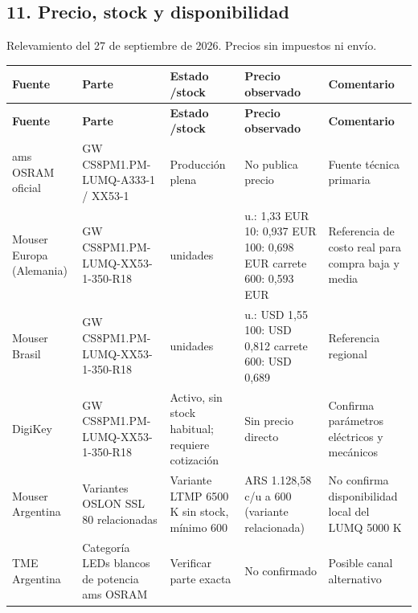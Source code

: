 \documentclass[11pt,a4paper]{article}
\begin{document}
\subsection*{11. Precio, stock y disponibilidad}

Relevamiento del 27 de septiembre de 2026. Precios sin impuestos ni envío.

\begingroup\footnotesize
\setlength{\tabcolsep}{3pt}
\setlength{\emergencystretch}{4em}
 
\begin{longtable}{@{}>{\RaggedRight\arraybackslash}p{}>{\RaggedRight\arraybackslash}p{}>{\RaggedRight\arraybackslash}p{}>{\RaggedRight\arraybackslash}p{}>{\RaggedRight\arraybackslash}p{}@{}}
\toprule
\scriptsize\textbf{Fuente} & \scriptsize\textbf{Parte} & \scriptsize\textbf{Estado \slash  stock} & \scriptsize\textbf{Precio observado} & \scriptsize\textbf{Comentario} \\
\midrule
\endfirsthead
\toprule
\scriptsize\textbf{Fuente} & \scriptsize\textbf{Parte} & \scriptsize\textbf{Estado \slash  stock} & \scriptsize\textbf{Precio observado} & \scriptsize\textbf{Comentario} \\
\midrule
\endhead
\bottomrule
\endfoot
ams OSRAM oficial & GW CS8PM1.PM-LUMQ-A333-1 / XX53-1 & Producción plena & No publica precio & Fuente técnica primaria \\
Mouser Europa (Alemania) & GW CS8PM1.PM-LUMQ-XX53-1-350-R18 & 1.669 unidades & 1 u.: 1,33 EUR \textperiodcentered{} 10: 0,937 EUR \textperiodcentered{} 100: 0,698 EUR \textperiodcentered{} carrete 600: 0,593 EUR & Referencia de costo real para compra baja y media \\
Mouser Brasil & GW CS8PM1.PM-LUMQ-XX53-1-350-R18 & 1.669 unidades & 1 u.: USD 1,55 \textperiodcentered{} 100: USD 0,812 \textperiodcentered{} carrete 600: USD 0,689 & Referencia regional \\
DigiKey & GW CS8PM1.PM-LUMQ-XX53-1-350-R18 & Activo, sin stock habitual; requiere cotización & Sin precio directo & Confirma parámetros eléctricos y mecánicos \\
Mouser Argentina & Variantes OSLON SSL 80 relacionadas & Variante LTMP 6500 K sin stock, mínimo 600 & ARS 1.128,58 c/u a 600 (variante relacionada) & No confirma disponibilidad local del LUMQ 5000 K \\
TME Argentina & Categoría LEDs blancos de potencia ams OSRAM & Verificar parte exacta & No confirmado & Posible canal alternativo \\
\end{longtable}
\endgroup
\end{document}

